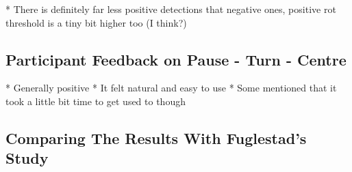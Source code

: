 * There is definitely far less positive detections that negative ones, positive rot threshold is a tiny bit higher too (I think?)

\subsection{Participant Feedback on Pause - Turn - Centre}
* Generally positive
* It felt natural and easy to use
* Some mentioned that it took a little bit time to get used to though

\subsection{Comparing The Results With Fuglestad's Study}
